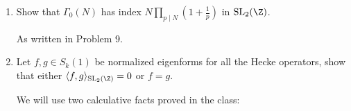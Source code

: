 \begin{enumerate}
\begin{proofc}[解答]
Consider the map $\mathrm{SL}_2(\Z) \to \mathrm{SL}_2(\Z/N\Z)$,
$\begin{bmatrix}
    a & b \\
    c & d
\end{bmatrix}\mapsto \begin{bmatrix}
    a & b \\
    c & d
\end{bmatrix}(\mathrm{mod} \ N)$,
then its kernel is $\Gamma(N)$, so $[\mathrm{SL}_2(\Z) : \Gamma(N)] = \mathrm{Card}(\mathrm{SL}_2(\Z/N\Z))$.

Assume $N = \prod_{p\mid N} p^{v_p}$, by Chinese Remainder Theorem, $\displaystyle \mathrm{Card}(\mathrm{SL}_2(\Z/N\Z)) = 
\prod_{p \mid N} \mathrm{Card}(\mathrm{SL}_2(\Z/p\Z)) = \prod_{p\mid N} (p^2-1)p^{3v_p} = N^3\prod_{p\mid N}(1-\frac{1}{p^2})$.

Consider the map $\Gamma_1(N) \to \Z/N\Z$, $\begin{bmatrix}
    1 & b \\
    0 & 1
\end{bmatrix} \mapsto b$, with the kernel $\Gamma(N)$, we have $[\Gamma_1(N) : \Gamma(N)] = N$, 

Consider the map $\Gamma_0(N) \to (\Z/N\Z)^*, \begin{bmatrix}
    a & b \\
    0 & d
\end{bmatrix}\mapsto d$, with the kernel $\Gamma_1(N)$, we have $\displaystyle [\Gamma_0(N) : \Gamma_1(N)] = \phi(N) = N\prod_{p\mid N}(1-\frac1p)$.

Then combine these three formulae, we have done.

\end{proofc}




\item Show that $\Gamma_0(N)$ has index $\displaystyle N \prod_{p \mid N} (1+\frac{1}{p})$ in $\mathrm{SL}_2(\Z)$.

\begin{proofc}[解答]
    As written in Problem 9.
\end{proofc}

\item Let $f, g \in S_k(1)$ be normalized eigenforms for all the Hecke operators, show that either $\langle f,g \rangle_{\mathrm{SL}_2(\Z)} = 0$ or $f = g$.

\begin{proofc}[解答]
We will use two calculative facts proved in the class:


\end{proofc}
\end{enumerate}
